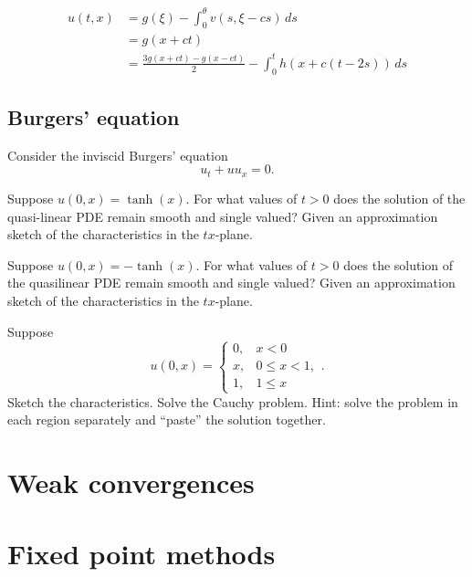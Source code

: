 \documentclass[11pt]{article}
\let\realsection\section
\renewcommand\section{\newpage\realsection}
\begin{document}
\begin{align*}
u(t,x)&=g(\xi)-\int_0^\theta v(s,\xi-cs)\,ds\\
&=g(x+ct)\\
&=\frac{3g(x+ct)-g(x-ct)}2-\int_0^th(x+c(t-2s))\,ds
\end{align*}



\clearpage
\subsection{Burgers' equation}

Consider the inviscid Burgers' equation
\[u_t+uu_x=0.\]
\begin{cond}
\item Suppose $u(0,x)=\tanh(x)$. For what values of $t>0$ does the solution of the quasi-linear PDE remain smooth and single valued? Given an approximation sketch of the characteristics in the $tx$-plane.
\item Suppose $u(0,x)=-\tanh(x)$. For what values of $t>0$ does the solution of the quasilinear PDE remain smooth and single valued? Given an approximation sketch of the characteristics in the $tx$-plane.
\item Suppose
\[u(0,x)=\begin{cases}0,&x<0\\x,&0\le x<1,\\1,&1\le x\end{cases}.\]
Sketch the characteristics. Solve the Cauchy problem. Hint: solve the problem in each region separately and ``paste'' the solution together.
\end{cond}


\section{Weak convergences}



\section{Fixed point methods}
\end{document}
